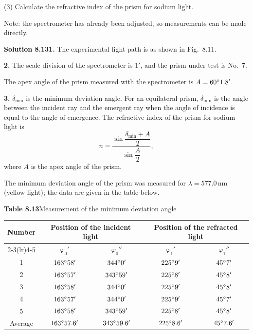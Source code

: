 (3) Calculate the refractive index of the prism for sodium light.

Note: the spectrometer has already been adjusted, so measurements can be made directly.

\textbf{Solution 8.13}\quad \textbf{1.} The experimental light path is as shown in Fig.~8.11.

\textbf{2.} The scale division of the spectrometer is $1'$, and the prism under test is No.~7.

The apex angle of the prism measured with the spectrometer is $A=60^{\circ}1.8'$.

\textbf{3.} $\delta_{\min}$ is the minimum deviation angle. For an equilateral prism, $\delta_{\min}$ is the angle between the incident ray and the emergent ray when the angle of incidence is equal to the angle of emergence. The refractive index of the prism for sodium light is
\[
n=\frac{\sin\dfrac{\delta_{\min}+A}{2}}{\sin\dfrac{A}{2}},
\]
where $A$ is the apex angle of the prism.

The minimum deviation angle of the prism was measured for $\lambda=577.0\,\mathrm{nm}$ (yellow light); the data are given in the table below.

\begin{center}
\textbf{Table 8.13}\quad Measurement of the minimum deviation angle\\[3pt]
\begin{tabular}{ccccc}
\toprule
Number & \multicolumn{2}{c}{Position of the incident light} & \multicolumn{2}{c}{Position of the refracted light} \\
\cmidrule(lr){2-3}\cmidrule(lr){4-5}
 & $\varphi_0'$ & $\varphi_0''$ & $\varphi_1'$ & $\varphi_1''$ \\
\midrule
1 & $163^{\circ}58'$ & $344^{\circ}0'$ & $225^{\circ}9'$ & $45^{\circ}7'$ \\
2 & $163^{\circ}57'$ & $343^{\circ}59'$ & $225^{\circ}8'$ & $45^{\circ}8'$ \\
3 & $163^{\circ}58'$ & $344^{\circ}0'$ & $225^{\circ}9'$ & $45^{\circ}8'$ \\
4 & $163^{\circ}57'$ & $344^{\circ}0'$ & $225^{\circ}9'$ & $45^{\circ}7'$ \\
5 & $163^{\circ}58'$ & $343^{\circ}59'$ & $225^{\circ}8'$ & $45^{\circ}8'$ \\
\midrule
Average & $163^{\circ}57.6'$ & $343^{\circ}59.6'$ & $225^{\circ}8.6'$ & $45^{\circ}7.6'$ \\
\bottomrule
\end{tabular}
\end{center}

